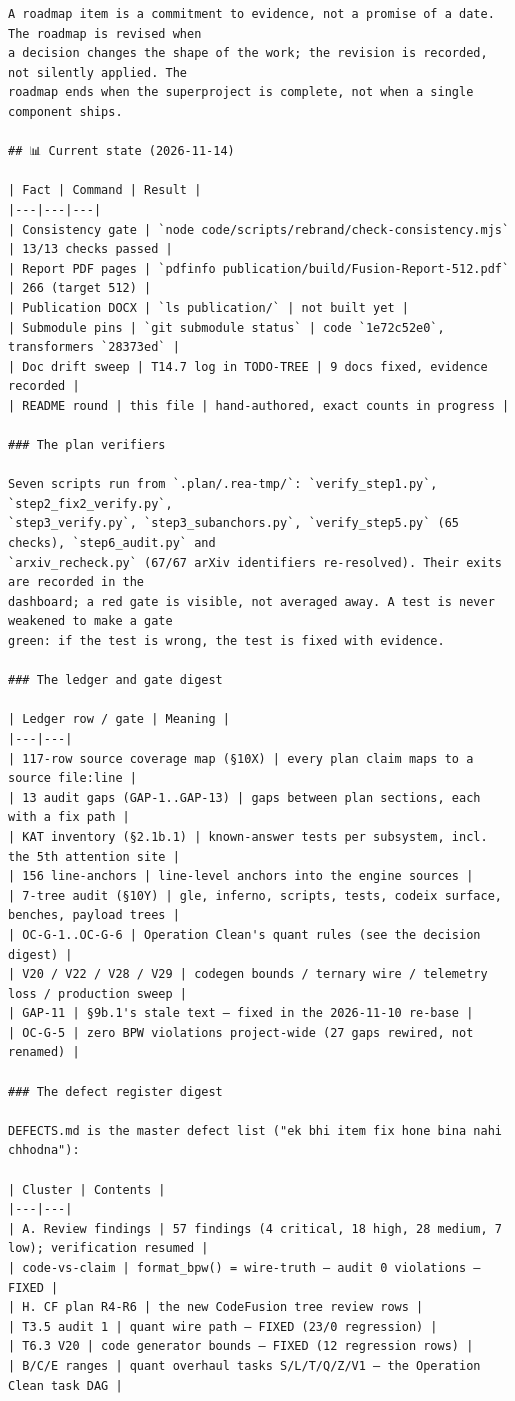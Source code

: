 \begin{Verbatim}[breaklines,breakanywhere,fontsize=\footnotesize]
A roadmap item is a commitment to evidence, not a promise of a date. The roadmap is revised when
a decision changes the shape of the work; the revision is recorded, not silently applied. The
roadmap ends when the superproject is complete, not when a single component ships.

## 📊 Current state (2026-11-14)

| Fact | Command | Result |
|---|---|---|
| Consistency gate | `node code/scripts/rebrand/check-consistency.mjs` | 13/13 checks passed |
| Report PDF pages | `pdfinfo publication/build/Fusion-Report-512.pdf` | 266 (target 512) |
| Publication DOCX | `ls publication/` | not built yet |
| Submodule pins | `git submodule status` | code `1e72c52e0`, transformers `28373ed` |
| Doc drift sweep | T14.7 log in TODO-TREE | 9 docs fixed, evidence recorded |
| README round | this file | hand-authored, exact counts in progress |

### The plan verifiers

Seven scripts run from `.plan/.rea-tmp/`: `verify_step1.py`, `step2_fix2_verify.py`,
`step3_verify.py`, `step3_subanchors.py`, `verify_step5.py` (65 checks), `step6_audit.py` and
`arxiv_recheck.py` (67/67 arXiv identifiers re-resolved). Their exits are recorded in the
dashboard; a red gate is visible, not averaged away. A test is never weakened to make a gate
green: if the test is wrong, the test is fixed with evidence.

### The ledger and gate digest

| Ledger row / gate | Meaning |
|---|---|
| 117-row source coverage map (§10X) | every plan claim maps to a source file:line |
| 13 audit gaps (GAP-1..GAP-13) | gaps between plan sections, each with a fix path |
| KAT inventory (§2.1b.1) | known-answer tests per subsystem, incl. the 5th attention site |
| 156 line-anchors | line-level anchors into the engine sources |
| 7-tree audit (§10Y) | gle, inferno, scripts, tests, codeix surface, benches, payload trees |
| OC-G-1..OC-G-6 | Operation Clean's quant rules (see the decision digest) |
| V20 / V22 / V28 / V29 | codegen bounds / ternary wire / telemetry loss / production sweep |
| GAP-11 | §9b.1's stale text — fixed in the 2026-11-10 re-base |
| OC-G-5 | zero BPW violations project-wide (27 gaps rewired, not renamed) |

### The defect register digest

DEFECTS.md is the master defect list ("ek bhi item fix hone bina nahi chhodna"):

| Cluster | Contents |
|---|---|
| A. Review findings | 57 findings (4 critical, 18 high, 28 medium, 7 low); verification resumed |
| code-vs-claim | format_bpw() = wire-truth — audit 0 violations — FIXED |
| H. CF plan R4-R6 | the new CodeFusion tree review rows |
| T3.5 audit 1 | quant wire path — FIXED (23/0 regression) |
| T6.3 V20 | code generator bounds — FIXED (12 regression rows) |
| B/C/E ranges | quant overhaul tasks S/L/T/Q/Z/V1 — the Operation Clean task DAG |


\end{Verbatim}
